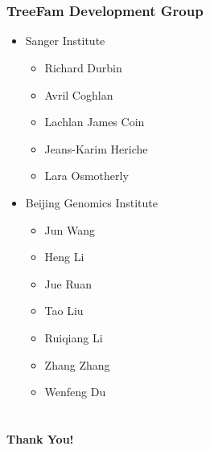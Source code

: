 \documentclass{beamer}
\begin{document}
\section*{}
\begin{frame}
	\frametitle{TreeFam Development Group}
	\begin{itemize}
		\item Sanger Institute
		\begin{itemize}
			\item Richard Durbin
			\item Avril Coghlan
			\item Lachlan James Coin
			\item Jeans-Karim Heriche
			\item Lara Osmotherly
		\end{itemize}
		\item Beijing Genomics Institute
		\begin{itemize}
			\item Jun Wang
			\item Heng Li
			\item Jue Ruan
			\item Tao Liu
			\item Ruiqiang Li
			\item Zhang Zhang
			\item Wenfeng Du
		\end{itemize}
	\end{itemize}
\end{frame}
\section*{}
\begin{frame}
	\begin{center}
	\Huge\textbf{Thank You!}
	\end{center}
\end{frame}
\end{document}
